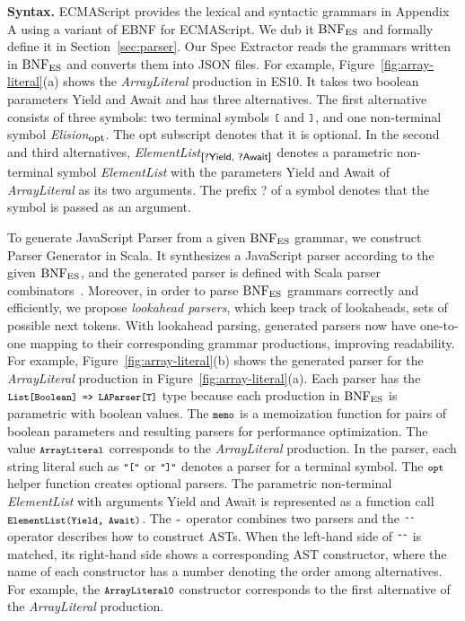 \textbf{Syntax.} ECMAScript provides the lexical and syntactic grammars in
Appendix A using a variant of EBNF for ECMAScript.  We dub it \( \text{BNF}_{\text{ES}} \) and
formally define it in Section~\ref{sec:parser}.  Our {\sf Spec Extractor} reads
the grammars written in \( \text{BNF}_{\text{ES}} \) and converts them into JSON files.
For example, Figure~\ref{fig:array-literal}(a) shows the \textit{ArrayLiteral}
production in ES10.  It takes two boolean parameters \textsf{Yield} and
\textsf{Await} and has three alternatives.  The first alternative
consists of three symbols: two terminal symbols \( \texttt{\footnotesize[} \) and
\( \texttt{\footnotesize]} \), and one non-terminal symbol \textit{Elision}$_{\mbox{\footnotesize opt}}$.
The {\small opt} subscript denotes that it is optional.  In the second
and third alternatives, \textit{ElementList}$_{\mbox{\footnotesize\sf [?Yield, ?Await]}}$
denotes a parametric non-terminal symbol \textit{ElementList}
with the parameters \textsf{Yield} and \textsf{Await} of
\textit{ArrayLiteral} as its two arguments. The prefix \textsf{\small ?}
of a symbol denotes that the symbol is passed as an argument.

To generate {\sf JavaScript Parser} from a given \( \text{BNF}_{\text{ES}} \) grammar, we
construct \textsf{Parser Generator} in Scala.  It synthesizes a
JavaScript parser according to the given \( \text{BNF}_{\text{ES}} \), and the
generated parser is defined with Scala parser combinators~\cite{scala-parser-combinators}.
Moreover, in order to parse \( \text{BNF}_{\text{ES}} \) grammars correctly and
efficiently, we propose \textit{lookahead parsers}, which keep track
of lookaheads, sets of possible next tokens.  With lookahead parsing,
generated parsers now have one-to-one mapping to their corresponding
grammar productions, improving readability.
For example, Figure~\ref{fig:array-literal}(b) shows the generated
parser for the \textit{ArrayLiteral} production in Figure~\ref{fig:array-literal}(a).
Each parser has the \( \texttt{\footnotesize List[Boolean] => LAParser[T]} \) type
because each production in \( \text{BNF}_{\text{ES}} \) is parametric with boolean values.
The \( \texttt{\footnotesize memo} \) is a memoization function for pairs of boolean
parameters and resulting parsers for performance optimization.
The value \( \texttt{\footnotesize ArrayLiteral} \) corresponds to the
\textit{ArrayLiteral} production.  In the parser, each string literal
such as \( \texttt{\footnotesize"["} \) or \( \texttt{\footnotesize"]"} \) denotes a parser for a
terminal symbol.  The \( \texttt{\footnotesize opt} \) helper function creates
optional parsers.  The parametric non-terminal \textit{ElementList}
with arguments \textsf{Yield} and \textsf{Await} is represented as a
function call \( \texttt{\footnotesize ElementList(Yield, Await)} \).
The \( \texttt{\footnotesize\textasciitilde} \) operator combines two parsers
and the \( \texttt{\footnotesize\^{}\^{}} \) operator describes how to construct ASTs.
When the left-hand side of \( \texttt{\footnotesize\^{}\^{}} \) is matched, its
right-hand side shows a corresponding AST constructor, where the name
of each constructor has a number denoting the order among alternatives.
For example, the \( \texttt{\footnotesize ArrayLiteral0} \) constructor corresponds to
the first alternative of the \textit{ArrayLiteral} production.

